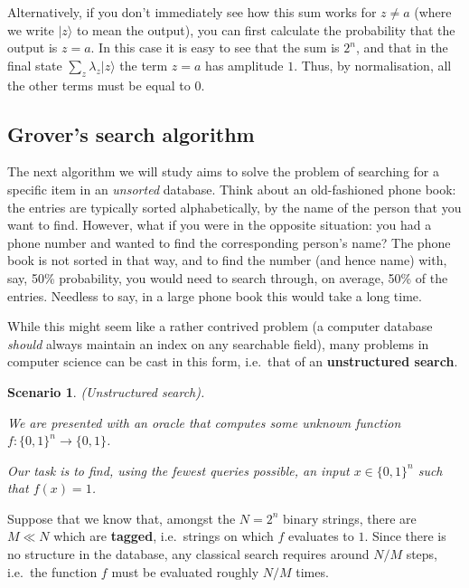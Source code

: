 \documentclass[fleqn,a4paper]{article}
\newtheorem*{scenario}{Scenario}
\theoremstyle{definition}
\theoremstyle{definition}
\theoremstyle{definition}
\theoremstyle{definition}
\theoremstyle{remark}
\begin{document}
Alternatively, if you don't immediately see how this sum works for \(z\neq a\) (where we write \(|z\rangle\) to mean the output), you can first calculate the probability that the output is \(z=a\).
In this case it is easy to see that the sum is \(2^n\), and that in the final state \(\sum_z\lambda_z|z\rangle\) the term \(z=a\) has amplitude \(1\).
Thus, by normalisation, all the other terms must be equal to \(0\).

\hypertarget{grovers-search-algorithm}{%
\subsection{Grover's search algorithm}\label{grovers-search-algorithm}}

The next algorithm we will study aims to solve the problem of searching for a specific item in an \emph{unsorted} database.
Think about an old-fashioned phone book: the entries are typically sorted alphabetically, by the name of the person that you want to find.
However, what if you were in the opposite situation: you had a phone number and wanted to find the corresponding person's name?
The phone book is not sorted in that way, and to find the number (and hence name) with, say, 50\% probability, you would need to search through, on average, 50\% of the entries.
Needless to say, in a large phone book this would take a long time.

While this might seem like a rather contrived problem (a computer database \emph{should} always maintain an index on any searchable field), many problems in computer science can be cast in this form, i.e.~that of an \textbf{unstructured search}.

\begin{scenario}

\emph{(Unstructured search).}

We are presented with an oracle that computes some unknown function \(f\colon\{0,1\}^n\to\{0,1\}\).

Our task is to find, using the fewest queries possible, an input \(x\in\{0,1\}^n\) such that \(f(x)=1\).

\end{scenario}

Suppose that we know that, amongst the \(N=2^n\) binary strings, there are \(M\ll N\) which are \textbf{tagged}, i.e.~strings on which \(f\) evaluates to \(1\).
Since there is no structure in the database, any classical search requires around \(N/M\) steps, i.e.~the function \(f\) must be evaluated roughly \(N/M\) times.
\end{document}
